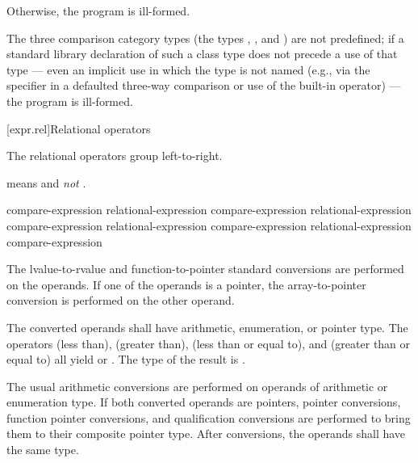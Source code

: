 \pnum
Otherwise, the program is ill-formed.

\pnum
The three comparison category types
(the types
,
, and
)
are not predefined;
if a standard library declaration
of such a class type does not precede
a use of that type ---
even an implicit use in which the type is not named
(e.g., via the  specifier
in a defaulted three-way comparison
or use of the built-in operator) --- the program is ill-formed.

[expr.rel]{Relational operators}%
%

\pnum
The relational operators group left-to-right.
\begin{example}
 means  and \emph{not}
.
\end{example}
%
%
%
%
%
%
%
%
%
\begin{bnf}
\br
    compare-expression\br
    relational-expression \terminal{<} compare-expression\br
    relational-expression \terminal{>} compare-expression\br
    relational-expression \terminal{<=} compare-expression\br
    relational-expression \terminal{>=} compare-expression
\end{bnf}
%
The
lvalue-to-rvalue
and function-to-pointer
standard conversions are performed on the operands.
If one of the operands is a pointer, the
array-to-pointer conversion is performed on the other operand.

\pnum
The converted operands shall have arithmetic, enumeration, or pointer type.
The
operators \tcode{<} (less than), \tcode{>} (greater than), \tcode{<=}
(less than or equal to), and \tcode{>=} (greater than or equal to) all
yield  or . The type of the result is
.

\pnum
The usual arithmetic conversions are performed on operands of arithmetic
or enumeration type. If both converted operands are pointers,
pointer conversions,
function pointer conversions, and
qualification conversions
are performed to bring
them to their composite pointer type.
After conversions, the operands shall have the same type.


